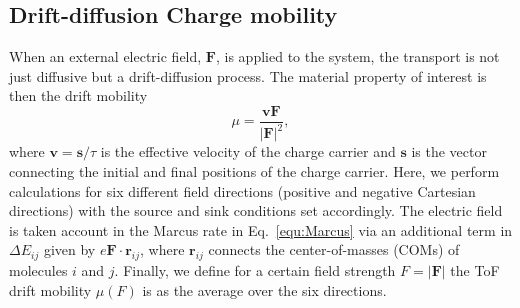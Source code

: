 \documentclass[%
 reprint,
superscriptaddress,
 amsmath,amssymb,
 aps,
prb,
floatfix
]{revtex4-2}
\begin{document}
\subsection{Drift-diffusion Charge mobility}
When an external electric field, $\mathbf{F}$, is applied to the system, the transport is not just diffusive but a drift-diffusion process. The material property of interest is then the drift mobility
%
\begin{equation}
    \mu = \frac{\mathbf{v} \mathbf{F} }{ |\mathbf{F}|^2},
    \label{eq:mu}
\end{equation}
%
where $\mathbf{v} = \mathbf{s}/{\tau}$ is the effective velocity of the charge carrier and $\mathbf{s}$ is the vector connecting the initial and final positions of the charge carrier. Here, we perform calculations for six different field directions (positive and negative Cartesian directions) with the source and sink conditions set accordingly. The electric field is taken account in the Marcus rate in Eq.~\ref{equ:Marcus} via an additional term in $\Delta E_{ij}$ given by $e\mathbf{F} \cdot \mathbf{r}_{ij}$, where $\mathbf{r}_{ij}$ connects the center-of-masses (COMs) of molecules $i$ and $j$. Finally, we define for a certain field strength $F=\vert\mathbf{F}\vert$ the ToF drift mobility $\mu(F)$ is as the average over the six directions. 
\end{document}
